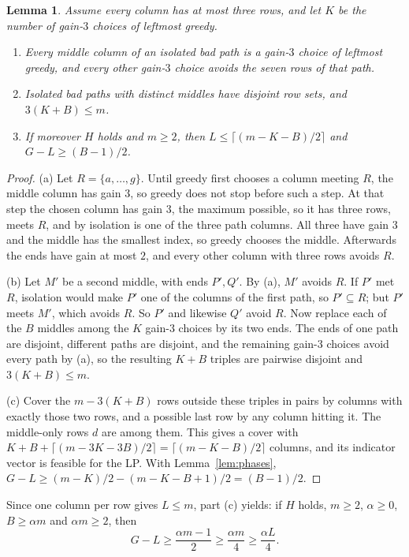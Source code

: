 \documentclass[11pt]{article}
\newtheorem{lemma}[theorem]{Lemma}
\theoremstyle{remark}
\begin{document}
\begin{lemma}\label{lem:exchange}
Assume every column has at most three rows, and let $K$ be the number of
gain-$3$ choices of leftmost greedy.
\begin{enumerate}
\item[(a)] Every middle column of an isolated bad path is a gain-$3$ choice
of leftmost greedy, and every other gain-$3$ choice avoids the seven rows
of that path.
\item[(b)] Isolated bad paths with distinct middles have disjoint row sets,
and $3(K+B)\le m$.
\item[(c)] If moreover $H$ holds and $m\ge2$, then
$L\le\lceil(m-K-B)/2\rceil$ and $G-L\ge(B-1)/2$.
\end{enumerate}
\end{lemma}

\begin{proof}
(a) Let $R=\{a,\dots,g\}$. Until greedy first chooses a column meeting
$R$, the middle column has gain $3$, so greedy does not stop before such a
step. At that step the chosen column has gain $3$, the maximum possible, so
it has three rows, meets $R$, and by isolation is one of the three path
columns. All three have gain $3$ and the middle has the smallest index, so
greedy chooses the middle. Afterwards the ends have gain at most $2$, and
every other column with three rows avoids $R$.

(b) Let $M'$ be a second middle, with ends $P',Q'$. By (a), $M'$ avoids
$R$. If $P'$ met $R$, isolation would make $P'$ one of the columns of the
first path, so $P'\subseteq R$; but $P'$ meets $M'$, which avoids $R$. So
$P'$ and likewise $Q'$ avoid $R$. Now replace each of the $B$ middles
among the $K$ gain-$3$ choices by its two ends. The ends of one path are
disjoint, different paths are disjoint, and the remaining gain-$3$ choices
avoid every path by (a), so the resulting $K+B$ triples are pairwise
disjoint and $3(K+B)\le m$.

(c) Cover the $m-3(K+B)$ rows outside these triples in pairs by columns
with exactly those two rows, and a possible last row by any column hitting
it. The middle-only rows $d$ are among them. This gives a cover with
$K+B+\lceil(m-3K-3B)/2\rceil=\lceil(m-K-B)/2\rceil$ columns, and its
indicator vector is feasible for the LP. With Lemma~\ref{lem:phases},
$G-L\ge(m-K)/2-(m-K-B+1)/2=(B-1)/2$.
\end{proof}

Since one column per row gives $L\le m$, part (c) yields: if $H$ holds,
$m\ge2$, $\alpha\ge0$, $B\ge\alpha m$ and $\alpha m\ge2$, then
\begin{equation}\label{eq:gap}
 G-L\ge\frac{\alpha m-1}2\ge\frac{\alpha m}4\ge\frac{\alpha L}4 .
\end{equation}
\end{document}
